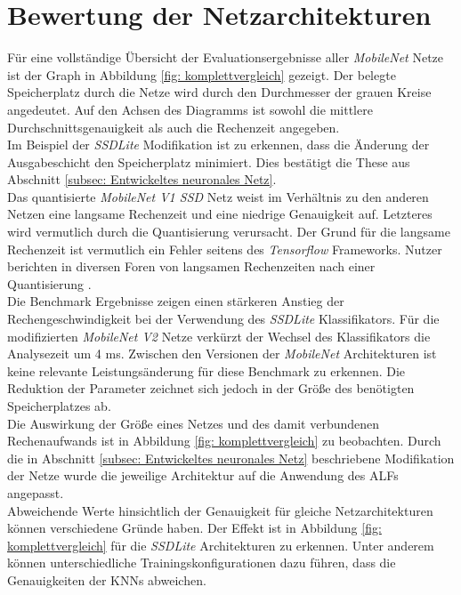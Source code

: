 \section{Bewertung der Netzarchitekturen}

Für eine vollständige Übersicht der Evaluationsergebnisse aller \textit{MobileNet} Netze ist der Graph in Abbildung \ref{fig: komplettvergleich} gezeigt. Der belegte Speicherplatz durch die Netze wird durch den Durchmesser der grauen Kreise angedeutet. Auf den Achsen des Diagramms ist sowohl die mittlere Durchschnittsgenauigkeit als auch die Rechenzeit angegeben.\\

Im Beispiel der \textit{SSDLite} Modifikation ist zu erkennen, dass die Änderung der Ausgabeschicht den Speicherplatz minimiert. Dies bestätigt die These aus Abschnitt \ref{subsec: Entwickeltes neuronales Netz}.\\

Das quantisierte \textit{MobileNet V1 SSD} Netz weist im Verhältnis zu den anderen Netzen eine langsame Rechenzeit und eine niedrige Genauigkeit auf. Letzteres wird vermutlich durch die Quantisierung verursacht. Der Grund für die langsame Rechenzeit ist vermutlich ein Fehler seitens des \textit{Tensorflow} Frameworks. Nutzer berichten in diversen Foren von langsamen Rechenzeiten nach einer Quantisierung \cite{quant}. \\

Die Benchmark Ergebnisse zeigen einen stärkeren Anstieg der Rechengeschwindigkeit bei der Verwendung des \textit{SSDLite} Klassifikators. Für die modifizierten \textit{MobileNet V2} Netze verkürzt der Wechsel des Klassifikators die Analysezeit um 4 ms. Zwischen den Versionen der \textit{MobileNet} Architekturen ist keine relevante Leistungsänderung für diese Benchmark zu erkennen. Die Reduktion der Parameter zeichnet sich jedoch in der Größe des benötigten Speicherplatzes ab.\\

Die Auswirkung der Größe eines Netzes und des damit verbundenen Rechenaufwands ist in Abbildung \ref{fig: komplettvergleich} zu beobachten. Durch die in Abschnitt \ref{subsec: Entwickeltes neuronales Netz} beschriebene Modifikation der Netze wurde die jeweilige Architektur auf die Anwendung des ALFs angepasst.\\





Abweichende Werte hinsichtlich der Genauigkeit für gleiche Netzarchitekturen können verschiedene Gründe haben. Der Effekt ist in Abbildung \ref{fig: komplettvergleich} für die \textit{SSDLite} Architekturen zu erkennen. Unter anderem können unterschiedliche Trainingskonfigurationen dazu führen, dass die Genauigkeiten der KNNs abweichen.\\

